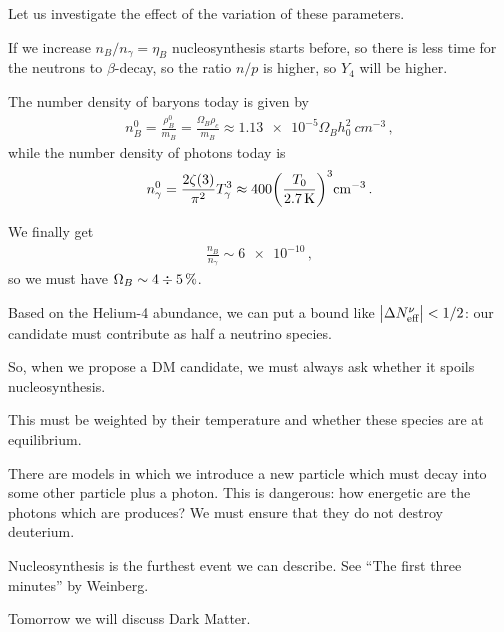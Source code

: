 \documentclass[main.tex]{subfiles}
\begin{document}
Let us investigate the effect of the variation of these parameters.

If we increase \(n_B / n_\gamma = \eta_B\) nucleosynthesis starts before, so there is less time for the neutrons to \(\beta\)-decay, so the ratio \(n/p\) is higher, so \(Y_4 \) will be higher. 

The number density of baryons today is given by 
%
\begin{align}
n^{0}_{B} = \frac{\rho_{B}^{0}}{m_B} = \frac{\Omega_{B} \rho_{c}}{m_B}
\approx \num{1.13e-5} \Omega_{B} h_0^2 \SI{}{cm^{-3}}
\,,
\end{align}
%
while the number density of photons today is 
%
\begin{align}
n_\gamma^{0} = \frac{2 \zeta (3)}{\pi^2} T_\gamma^3 \approx 400 \qty( \frac{T_0 }{\SI{2.7}{K}})^3 \SI{}{cm^{-3}}
\,.
\end{align}



We finally get 
%
\begin{align}
\frac{n_B}{n_\gamma } \sim \num{6e-10}
\,,
\end{align}
%
so we must have \(\Omega_{B} \sim \num{4} \divisionsymbol \SI{5}{\percent}\).

Based on the Helium-4 abundance, we can put a bound like \(\abs{\Delta N _{\text{eff}}^{\nu }} < 1/2\): our candidate must contribute as half a neutrino species.

So, when we propose a DM candidate, we must always ask whether it spoils nucleosynthesis. 

This must be weighted by their temperature and whether these species are at equilibrium. 

There are models in which we introduce a new particle which must decay into some other particle plus a photon. 
This is dangerous: how energetic are the photons which are produces? We must ensure that they do not destroy deuterium. 

Nucleosynthesis is the furthest event we can describe. 
See ``The first three minutes'' by Weinberg.

Tomorrow we will discuss Dark Matter. 
\end{document}
